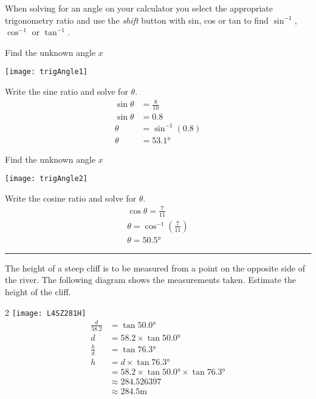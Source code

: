 When solving for an angle on your calculator you select the appropriate trigonometry ratio and use the \emph{shift} button with sin, cos or tan to find $\sin ^{ -1}$, $\cos ^{ -1}$ or $\tan ^{ -1}$. 
\begin{multicols}{2}
	\example Find the unknown angle $x$\\
	\begin{center}
		\texttt{[image: trigAngle1]}
	\end{center}
	
	\columnbreak
	\solution Write the sine ratio and solve for $\theta$.\\
	\begin{align*}\sin \theta &= \frac{8}{10}\\
	\sin\theta&=0.8\\
	\theta&=\sin^{-1}(0.8)\\
	\theta&=\ang{53.1}
	\end{align*}
\end{multicols}
\clearpage
\begin{multicols}{2}
	\example Find the unknown angle $x$\\
	\begin{center}
		\texttt{[image: trigAngle2]}
	\end{center}
	\columnbreak
	\solution Write the cosine ratio and solve for $\theta$.
	\begin{align*}\cos \theta = \frac{7}{11}\\
	\theta=\cos^{-1} \left(\frac{7}{11}\right)\\
	\theta=\ang{50.5}
	\end{align*}
\end{multicols}
\rule{\textwidth}{0.5pt}
\example The height of a steep cliff is to be measured from a point on the opposite side of the river. The following diagram shows the measurements taken. Estimate the height of the cliff.
\begin {multicols}{2}
\texttt{[image: L4SZ281H]}
\columnbreak\\
\solution 
\begin{align*}\frac{d}{58.2} &  =  \tan  \ang{50.0}  \\
d &  =  58.2 \times \tan  \ang{50.0}  \\
\frac{h}{d} &  =  \tan  \ang{76.3}  \\
h &  =  d \times \tan  \ang{76.3}  \\
 &  =  58.2 \times \tan  \ang{50.0}  \times \tan  \ang{76.3}  \\
 &  \approx   284.526397 \\
 &  \approx   284.5 \mbox{m}\end{align*}
\end{multicols}

